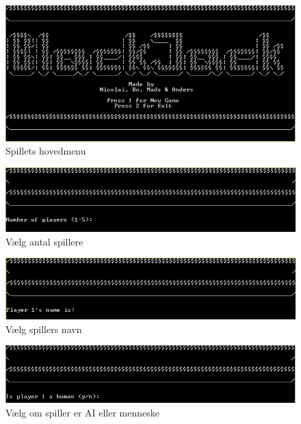 \documentclass[a4paper]{article}
\begin{document}
        \begin{figure}[H]
          \includegraphics{figures/MainMenu.PNG}

          \caption{Spillets hovedmenu}
          \label{fig:mainMenu}
        \end{figure}

        \begin{figure}[H]
          \includegraphics{figures/SelectPlayers.PNG}

          \caption{Vælg antal spillere}
          \label{fig:selectPlayers}
        \end{figure}

        \begin{figure}[H]
          \includegraphics{figures/PlayerName.PNG}

          \caption{Vælg spillers navn}
          \label{fig:selectPlayerName}
        \end{figure}

        \begin{figure}[H]
          \includegraphics{figures/PlayerIsHuman.PNG}

          \caption{Vælg om spiller er AI eller menneske}
          \label{fig:selectPlayerIsHuman}
        \end{figure}
\end{document}
